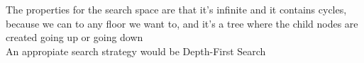 \documentclass[paper=a4, fontsize=11pt]{scrartcl} %
\numberwithin{equation}{section} %
\numberwithin{figure}{section} %
\numberwithin{table}{section} %
\begin{document}
The properties for the search space are that it's infinite and it contains cycles, because we can to any floor we want to, and it's a tree where the child nodes are created going up or going down\\

An appropiate search strategy would be Depth-First Search\\


\end{document}

